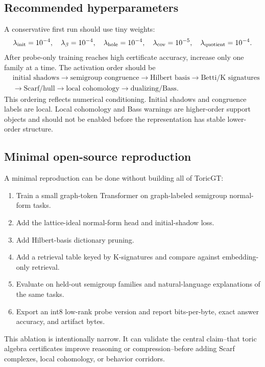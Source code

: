 \documentclass[11pt]{article}
\theoremstyle{definition}
\begin{document}
\subsection{Recommended hyperparameters}
A conservative first run should use tiny weights:
\[
\lambda_{\rm init}=10^{-4},\quad
\lambda_{\beta}=10^{-4},\quad
\lambda_{\rm hole}=10^{-4},\quad
\lambda_{\rm cov}=10^{-5},\quad
\lambda_{\rm quotient}=10^{-4}.
\]
After probe-only training reaches high certificate accuracy, increase only one family at a time.  The activation order should be
\[
\begin{aligned}
&\text{initial shadows}\to\text{semigroup congruence}\to\text{Hilbert basis}\to\text{Betti/K signatures}\\
&\to\text{Scarf/hull}\to\text{local cohomology}\to\text{dualizing/Bass}.
\end{aligned}
\]
This ordering reflects numerical conditioning.  Initial shadows and congruence labels are local.  Local cohomology and Bass warnings are higher-order support objects and should not be enabled before the representation has stable lower-order structure.

\subsection{Minimal open-source reproduction}
A minimal reproduction can be done without building all of ToricGT:
\begin{enumerate}[leftmargin=*]
\item Train a small graph-token Transformer on graph-labeled semigroup normal-form tasks.
\item Add the lattice-ideal normal-form head and initial-shadow loss.
\item Add Hilbert-basis dictionary pruning.
\item Add a retrieval table keyed by K-signatures and compare against embedding-only retrieval.
\item Evaluate on held-out semigroup families and natural-language explanations of the same tasks.
\item Export an int8 low-rank probe version and report bits-per-byte, exact answer accuracy, and artifact bytes.
\end{enumerate}
This ablation is intentionally narrow.  It can validate the central claim--that toric algebra certificates improve reasoning or compression--before adding Scarf complexes, local cohomology, or behavior corridors.
\end{document}
